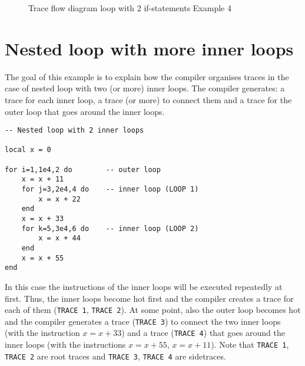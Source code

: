 \begin{figure}[H]
\caption{Trace flow diagram loop with 2 if-statements Example 4}
\label{fig:2if-exemple4}
\end{figure}

\section{Nested loop with more inner loops}
\label{section:2-inner-loops}

The goal of this example is to explain how the compiler organises traces in the case of nested loop with two (or more) inner loops. The compiler generates: a trace for each inner loop, a trace (or more) to connect them
and a trace for the outer loop that goes around the inner loops.

\begin{mdframed}[style=LuaStyleFrame]
\begin{lstlisting}[style=LuaStyle]
-- Nested loop with 2 inner loops

local x = 0

for i=1,1e4,2 do        -- outer loop
	x = x + 11
	for j=3,2e4,4 do    -- inner loop (LOOP 1)
		x = x + 22
	end
	x = x + 33
	for k=5,3e4,6 do    -- inner loop (LOOP 2)
		x = x + 44
	end
	x = x + 55
end
\end{lstlisting}
\end{mdframed}

\noindent
In this case the instructions of the inner loops will be executed repeatedly at first. Thus, the inner loops become hot first and the compiler creates a trace for each of them (\texttt{TRACE 1}, \texttt{TRACE 2}). At some point, also the outer loop becomes hot and the compiler generates a trace (\texttt{TRACE 3}) to connect the two inner loops (with the instruction $x=x+33$) and a trace (\texttt{TRACE 4}) that goes around the inner loops (with the instructions $x=x+55$, $x=x+11$). Note that \texttt{TRACE 1}, \texttt{TRACE 2} are root traces and \texttt{TRACE 3}, \texttt{TRACE 4} are sidetraces.

